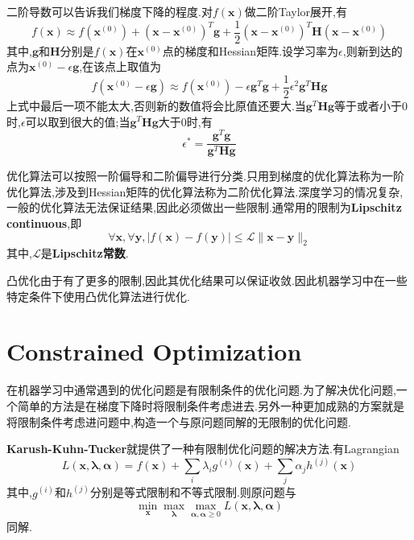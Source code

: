 二阶导数可以告诉我们梯度下降的程度.对$f(\mathbf x)$做二阶Taylor展开,有
\begin{equation}
f(\mathbf x)\approx f(\mathbf x^{(0)})+(\mathbf x-\mathbf x^{(0)})^T\mathbf g+\frac{1}{2}(\mathbf x-\mathbf x^{(0)})^T\mathbf H(\mathbf x-\mathbf x^{(0)})
\end{equation}
其中,$\mathbf g$和$\mathbf H$分别是$f(\mathbf x)$在$\mathbf x^{(0)}$点的梯度和Hessian矩阵.设学习率为$\epsilon$,则新到达的点为$\mathbf x^{(0)}-\epsilon\mathbf g$,在该点上取值为
\begin{equation}\label{eq:second_order_taylor_expansion}
f(\mathbf x^{(0)}-\epsilon\mathbf g)\approx f(\mathbf x^{(0)})-\epsilon\mathbf g^T\mathbf g+\frac{1}{2}\epsilon^2\mathbf g^T\mathbf{Hg}
\end{equation}
上式中最后一项不能太大,否则新的数值将会比原值还要大.当$\mathbf g^T\mathbf{Hg}$等于或者小于$0$时,$\epsilon$可以取到很大的值;当$\mathbf g^T\mathbf{Hg}$大于$0$时,有
\begin{equation}
\epsilon^\ast=\frac{\mathbf g^T\mathbf g}{\mathbf g^T\mathbf{Hg}}
\end{equation}

优化算法可以按照一阶偏导和二阶偏导进行分类.只用到梯度的优化算法称为一阶优化算法,涉及到Hessian矩阵的优化算法称为二阶优化算法.深度学习的情况复杂,一般的优化算法无法保证结果,因此必须做出一些限制.通常用的限制为\textbf{Lipschitz continuous},即
\begin{equation}
\forall\mathbf x,\forall\mathbf y,|f(\mathbf x)-f(\mathbf y)|\le\mathcal L\|\mathbf{x-y}\|_2
\end{equation}
其中,$\mathcal L$是\textbf{Lipschitz常数}.

凸优化由于有了更多的限制,因此其优化结果可以保证收敛.因此机器学习中在一些特定条件下使用凸优化算法进行优化.

\section{Constrained Optimization}
在机器学习中通常遇到的优化问题是有限制条件的优化问题.为了解决优化问题,一个简单的方法是在梯度下降时将限制条件考虑进去.另外一种更加成熟的方案就是将限制条件考虑进问题中,构造一个与原问题同解的无限制的优化问题.

\textbf{Karush-Kuhn-Tucker}就提供了一种有限制优化问题的解决方法.有Lagrangian
\begin{equation}
L(\mathbf{x,\lambda,\alpha})=f(\mathbf x)+\sum_i\lambda_ig^{(i)}(\mathbf x)+\sum_j\alpha_jh^{(j)}(\mathbf x)
\end{equation}
其中,$g^{(i)}$和$h^{(j)}$分别是等式限制和不等式限制.则原问题与
\begin{equation}
\min_{\mathbf x}\max_{\mathbf\lambda}\max_{\mathbf{\alpha,\alpha}\ge 0}L(\mathbf{x,\lambda,\alpha})
\end{equation}
同解.